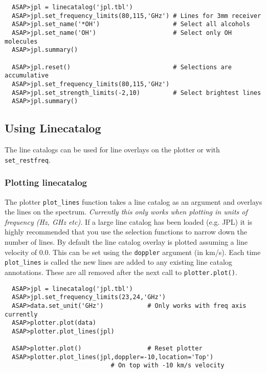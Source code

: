 \documentclass[11pt]{article}
\newcommand{\cmd}[1]{{\tt #1}}
\begin{document}
\begin{verbatim}
  ASAP>jpl = linecatalog('jpl.tbl')
  ASAP>jpl.set_frequency_limits(80,115,'GHz') # Lines for 3mm receiver
  ASAP>jpl.set_name('*OH')                    # Select all alcohols
  ASAP>jpl.set_name('OH')                     # Select only OH molecules
  ASAP>jpl.summary()

  ASAP>jpl.reset()                            # Selections are accumulative
  ASAP>jpl.set_frequency_limits(80,115,'GHz') 
  ASAP>jpl.set_strength_limits(-2,10)         # Select brightest lines
  ASAP>jpl.summary() 
\end{verbatim}

\subsection{Using Linecatalog}

The line catalogs can be used for line overlays on the plotter or with
\cmd{set\_restfreq}.

\subsubsection{Plotting linecatalog}


The plotter \cmd{plot\_lines} function takes a line catalog as an
argument and overlays the lines on the spectrum. {\em Currently this
only works when plotting in units of frequency (Hz, GHz etc).} If a
large line catalog has been loaded (e.g. JPL) it is highly recommended
that you use the selection functions to narrow down the number of
lines.  By default the line catalog overlay is plotted assuming a line
velocity of 0.0. This can be set using the \cmd{doppler} argument (in
km/s). Each time \cmd{plot\_lines} is called the new lines are added
to any existing line catalog annotations. These are all removed after
the next call to \cmd{plotter.plot()}.

\begin{verbatim}
  ASAP>jpl = linecatalog('jpl.tbl')
  ASAP>jpl.set_frequency_limits(23,24,'GHz')
  ASAP>data.set_unit('GHz')            # Only works with freq axis currently
  ASAP>plotter.plot(data)
  ASAP>plotter.plot_lines(jpl)

  ASAP>plotter.plot()                  # Reset plotter
  ASAP>plotter.plot_lines(jpl,doppler=-10,location='Top') 
                             # On top with -10 km/s velocity
\end{verbatim}
\end{document}
